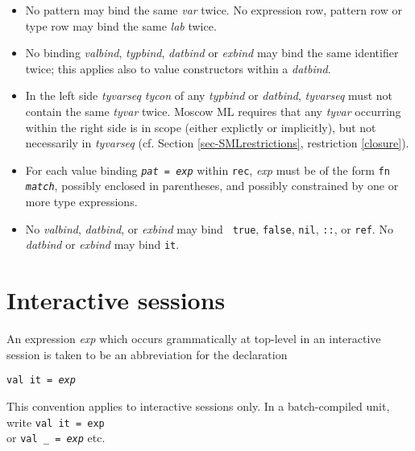 \documentclass[fleqn,a4paper]{article}
\begin{document}
\begin{itemize}
\item No pattern may bind the same {\it var\/} twice.  No expression
  row, pattern row or type row may bind the same {\it lab\/} twice.

\item No binding {\it valbind\/}, {\it typbind\/}, {\it datbind\/} or
  {\it exbind\/} may bind the same identifier twice; this applies also
  to value constructors within a {\it datbind\/}.
        
\item In the left side {\it tyvarseq tycon\/} of any {\it typbind\/}
  or {\it datbind\/}, {\it tyvarseq\/} must not contain the same {\it
    tyvar\/} twice.  
    Moscow ML 
    requires that   any {\it tyvar\/} occurring within the right side
    is in scope (either explictly or implicitly), but not necessarily in
    {\it tyvarseq} (cf. Section \ref{sec-SMLrestrictions}, restriction \ref{closure}).

\item For each value binding {\tt {\it pat\/} = {\it exp\/}} within
  {\tt rec}, {\it exp\/} must be of the form {\tt fn {\it match\/}},
  possibly enclosed in parentheses, and possibly constrained by one or
  more type expressions.
  
\item No {\it valbind}, {\it datbind}, or {\it exbind} may bind {\tt
    true}, {\tt false}, {\tt nil}, {\tt ::}, or {\tt ref}.  No {\it
    datbind} or {\it exbind} may bind {\tt it}.


\end{itemize}


\section{Interactive sessions}

An expression {\it exp\/} which occurs grammatically at top-level in
an interactive session is taken to be an abbreviation for the
declaration

\begin{quot}
{\tt val it = {\it exp\/}}  
\end{quot}

\noindent This convention applies to interactive sessions only.  In a
batch-compiled unit, write {\tt val it = {\tt exp}}\\ or {\tt val \verb#_# =
  {\it exp\/}} etc.

\newpage
\end{document}
